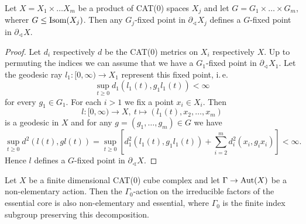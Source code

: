 \begin{lemma}[{\cite[Lemma~2.9]{MR3509968}}]
  \label{lem:2.9}
  Let \(X = X_1 \times \dots X_m\) be a product of CAT(0) spaces \(X_j\) and let \(G = G_1 \times \dots \times G_m\), wherer \(G \leq \operatorname{Isom}(X_j)\). Then any \(G_j\)-fixed point in \(\partial_\sphericalangle X_j\) defines a \(G\)-fixed point in \(\partial_\sphericalangle X\).
\end{lemma}

\begin{proof}
  Let \(d_i\) respectively \(d\) be the CAT(0) metrics on \(X_i\) respectively \(X\). Up to permuting the indices we can assume that we have a \(G_1\)-fixed point in \(\partial_\sphericalangle X_1\). Let the geodesic ray \(l_1\colon [0,\infty) \to X_1\) represent this fixed point, i.\,e.\
  \[
    \sup_{t \geq 0} d_1(l_1(t), g_1l_1(t)) < \infty
  \]
  for every \(g_1 \in G_1\). For each \(i > 1\) we fix a point \(x_i \in X_i\). Then
  \[
    l\colon [0, \infty) \to X,\ t \mapsto (l_1(t), x_2, \dots, x_m)
  \]
  is a geodesic in \(X\) and for any \(g = (g_1, \dots, g_m) \in G\) we have
  \[
    \sup_{t \geq 0} d^2(l(t), gl(t)) = \sup_{t \geq 0} \left [ d_1^2(l_1(t), g_1l_1(t)) + \sum_{i=2}^m d_i^2(x_i, g_ix_i)\right] < \infty.
  \]
  Hence \(l\) defines a \(G\)-fixed point in \(\partial_\sphericalangle X\).
\end{proof}

\begin{lemma}[{\cite[Lemma~2.28]{MR3509968}}]
  \label{lem:2.28}
  Let \(X\) be a finite dimensional CAT(0) cube complex and let \(\Gamma \to \operatorname{Aut}(X)\) be a non-elementary action. Then the \(\Gamma_0\)-action on the irreducible factors of the essential core is also non-elementary and essential, where \(\Gamma_0\) is the finite index subgroup preserving this decomposition.
\end{lemma}

